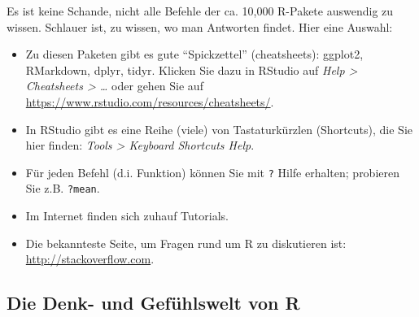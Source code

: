 \documentclass[12pt,]{book}
\begin{document}
Es ist keine Schande, nicht alle Befehle der ca. 10,000 R-Pakete
auswendig zu wissen. Schlauer ist, zu wissen, wo man Antworten findet.
Hier eine Auswahl:

\begin{itemize}
\item
  Zu diesen Paketen gibt es gute ``Spickzettel'' (cheatsheets): ggplot2,
  RMarkdown, dplyr, tidyr. Klicken Sie dazu in RStudio auf \emph{Help
  \textgreater{} Cheatsheets \textgreater{} \ldots{}} oder gehen Sie auf
  \url{https://www.rstudio.com/resources/cheatsheets/}.
\item
  In RStudio gibt es eine Reihe (viele) von Tastaturkürzlen (Shortcuts),
  die Sie hier finden: \emph{Tools \textgreater{} Keyboard Shortcuts
  Help}.
\item
  Für jeden Befehl (d.i. Funktion) können Sie mit \texttt{?} Hilfe
  erhalten; probieren Sie z.B. \texttt{?mean}.
\item
  Im Internet finden sich zuhauf Tutorials.
\item
  Die bekannteste Seite, um Fragen rund um R zu diskutieren ist:
  \url{http://stackoverflow.com}.
\end{itemize}

\subsection{Die Denk- und Gefühlswelt von
R}\label{die-denk--und-gefuhlswelt-von-r}
\end{document}
